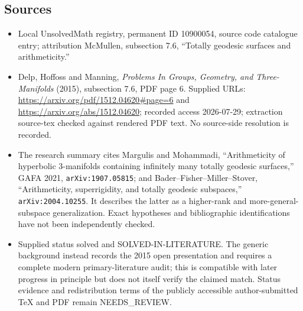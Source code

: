 \documentclass[11pt]{article}
\begin{document}
\subsection{Sources}
\begin{itemize}
\item Local UnsolvedMath registry, permanent ID 10900054, source code catalogue entry; attribution McMullen, subsection 7.6, ``Totally geodesic surfaces and arithmeticity.''
\item Delp, Hoffoss and Manning, \emph{Problems In Groups, Geometry, and Three-Manifolds} (2015), subsection 7.6, PDF page 6. Supplied URLs: \url{https://arxiv.org/pdf/1512.04620#page=6} and \url{https://arxiv.org/abs/1512.04620}; recorded access 2026-07-29; extraction source-tex checked against rendered PDF text. No source-side resolution is recorded.
\item The research summary cites Margulis and Mohammadi, ``Arithmeticity of hyperbolic 3-manifolds containing infinitely many totally geodesic surfaces,'' GAFA 2021, \texttt{arXiv:1907.05815}; and Bader--Fisher--Miller--Stover, ``Arithmeticity, superrigidity, and totally geodesic subspaces,'' \texttt{arXiv:2004.10255}. It describes the latter as a higher-rank and more-general-subspace generalization. Exact hypotheses and bibliographic identifications have not been independently checked.
\item Supplied status solved and SOLVED-IN-LITERATURE. The generic background instead records the 2015 open presentation and requires a complete modern primary-literature audit; this is compatible with later progress in principle but does not itself verify the claimed match. Status evidence and redistribution terms of the publicly accessible author-submitted TeX and PDF remain NEEDS\_REVIEW.
\end{itemize}
\end{document}
